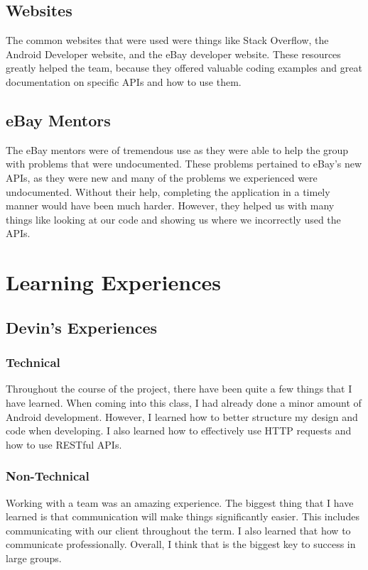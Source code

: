 \documentclass[journal,compsoc, 10pt, draftclsnofoot, onecolumn]{IEEEtran}
\begin{document}
\subsection{Websites}
The common websites that were used were things like Stack Overflow, the Android Developer
website, and the eBay developer website. These resources greatly helped the team, because they
offered valuable coding examples and great documentation on specific APIs and how to use them.

\subsection{eBay Mentors}
The eBay mentors were of tremendous use as they were able to help the group with problems that
were undocumented. These problems pertained to eBay's new APIs, as they were new and many of
the problems we experienced were undocumented. Without their help, completing the application
in a timely manner would have been much harder. However, they helped us with many things like
looking at our code and showing us where we incorrectly used the APIs.

\section{Learning Experiences}
\subsection{Devin's Experiences}
\subsubsection{Technical}
Throughout the course of the project, there have been quite a few things that I 
have learned. When coming into this class, I had already done a minor amount of 
Android development. However, I learned how to better structure my design and 
code when developing. I also learned how to effectively use HTTP requests and 
how to use RESTful APIs. 

\subsubsection{Non-Technical}
Working with a team was an amazing experience. The biggest thing that I have 
learned is that communication will make things significantly easier. This includes 
communicating with our client throughout the term. I also learned that how to 
communicate professionally. Overall, I think that is the biggest key to success
in large groups. 
\end{document}

